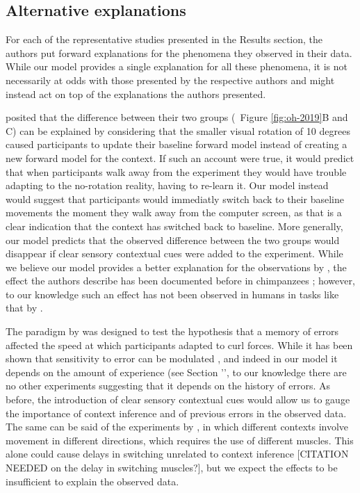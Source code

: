 \documentclass[a4paper,doc,floatsintext,natbib]{apa6}
\def \fref #1{Figure \ref{#1}}     %
\def \sref #1{Section '\nameref{#1}'}    %
\begin{document}
\subsection{Alternative explanations}
For each of the representative studies presented in the Results section, the authors put forward explanations for the phenomena they observed in their data. While our model provides a single explanation for all these phenomena, it is not necessarily at odds with those presented by the respective authors and might instead act on top of the explanations the authors presented.

\cite{Oh_Minimizing_2019} posited that the difference between their two groups (~\fref{fig:oh-2019}B and C) can be explained by considering that the smaller visual rotation of 10 degrees caused participants to update their baseline forward model instead of creating a new forward model for the context. If such an account were true, it would predict that when participants walk away from the experiment they would have trouble adapting to the no-rotation reality, having to re-learn it. Our model instead would suggest that participants would immediatly switch back to their baseline movements the moment they walk away from the computer screen, as that is a clear indication that the context has switched back to baseline. More generally, our model predicts that the observed difference between the two groups would disappear if clear sensory contextual cues were added to the experiment. While we believe our model provides a better explanation for the observations by \cite{Oh_Minimizing_2019}, the effect the authors describe has been documented before in chimpanzees \citep{Kojima_Memory_2004}; however, to our knowledge such an effect has not been observed in humans in tasks like that by \cite{Oh_Minimizing_2019}.

The paradigm by \cite{Herzfeld_memory_2014} was designed to test the hypothesis that a memory of errors affected the speed at which participants adapted to curl forces. While it has been shown that sensitivity to error can be modulated \cite{Marko_Sensitivity_2012}, and indeed in our model it depends on the amount of experience (see \sref{sec:interpreting-hyperparameters}, to our knowledge there are no other experiments suggesting that it depends on the history of errors. As before, the introduction of clear sensory contextual cues would allow us to gauge the importance of context inference and of previous errors in the observed data. The same can be said of the experiments by \cite{Davidson_Scaling_2004}, in which different contexts involve movement in different directions, which requires the use of different muscles. This alone could cause delays in switching unrelated to context inference [CITATION NEEDED on the delay in switching muscles?], but we expect the effects to be insufficient to explain the observed data.
\end{document}
